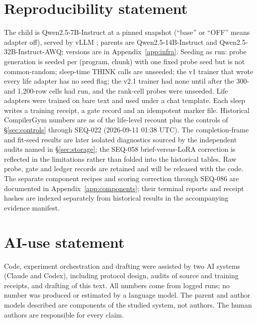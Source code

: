 \documentclass{article}
\begin{document}
\section*{Reproducibility statement}
The child is Qwen2.5-7B-Instruct \citep{qwen2025qwen25} at a pinned snapshot (``base'' or ``OFF'' means adapter off), served by vLLM \citep{kwon2023vllm}; parents are Qwen2.5-14B-Instruct and Qwen2.5-32B-Instruct-AWQ; versions are in Appendix~\ref{app:infra}. Seeding as run: probe generation is seeded per (program, chunk) with one fixed probe seed but is not common-random; sleep-time THINK calls are unseeded; the v1 trainer that wrote every life adapter has no seed flag; the v2.1 trainer had none until after the 300- and 1{,}200-row cells had run, and the rank-cell probes were unseeded. Life adapters were trained on bare text and used under a chat template. Each sleep writes a training receipt, a gate record and an idempotent marker file. Historical CompilerGym numbers are as of the life-level recount plus the controls of \S\ref{sec:controls} through SEQ-022 (2026-09-11 01:38 UTC). The completion-frame and fit-seed results are later isolated diagnostics sourced by the independent audits named in \S\ref{sec:storage}; the SEQ-058 brief-versus-LoRA correction is reflected in the limitations rather than folded into the historical tables. Raw probe, gate and ledger records are retained and will be released with the code. The separate component recipes and scoring correction through SEQ-086 are documented in Appendix~\ref{app:components}; their terminal reports and receipt hashes are indexed separately from historical results in the accompanying evidence manifest.

\section*{AI-use statement}
Code, experiment orchestration and drafting were assisted by two AI systems (Claude and Codex), including protocol design, audits of source and training receipts, and drafting of this text. All numbers come from logged runs; no number was produced or estimated by a language model. The parent and author models described are components of the studied system, not authors. The human authors are responsible for every claim.


\end{document}
